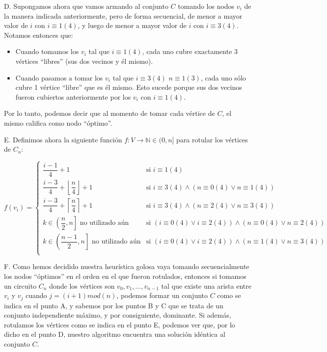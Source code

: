 D. Supongamos ahora que vamos armando al conjunto $C$ tomando los nodos $v_i$ de la manera indicada anteriormente, pero de forma secuencial, de menor a mayor valor de $i$ con $i \equiv 1 (4)$, y luego de menor a mayor valor de $i$ con $i \equiv 3 (4)$. Notamos entonces que:

\begin{itemize}
	\item Cuando tomamos los $v_i$ tal que $i \equiv 1 (4)$, cada uno cubre exactamente 3 vértices ``libres'' (sus dos vecinos y él mismo).
	\item Cuando pasamos a tomar los $v_i$ tal que $i \equiv 3 (4)$ $n \equiv 1 (3)$, cada uno sólo cubre 1 vértice ``libre'' que es él mismo.  Esto sucede porque sus dos vecinos fueron cubiertos anteriormente por los $v_i$ con $i \equiv 1 (4)$.
\end{itemize}

Por lo tanto, podemos decir que al momento de tomar cada vértice de $C$, el mismo califica como nodo ``óptimo''.

E. Definimos ahora la siguiente función $f:V \rightarrow \mathbb{N} \in (0,n]$ para rotular los vértices de $C_n$:

\begin{equation*}
f(v_i) = \begin{cases}
\dfrac{i-1}{4}+1 & \text{si } i \equiv 1 (4)\\
\dfrac{i-3}{4}+\left\lfloor \dfrac{n}{4} \right\rfloor + 1 & \text{si } i \equiv 3 (4) \wedge (n \equiv 0 (4) \vee n \equiv 1 (4))\\
\dfrac{i-3}{4}+\left\lceil \dfrac{n}{4} \right\rceil + 1 & \text{si } i \equiv 3 (4) \wedge (n \equiv 2 (4) \vee n \equiv 3 (4))\\
k \in \left(\dfrac{n}{2},n\right] \text{ no utilizado aún} & \text{si } (i \equiv 0 (4) \vee i \equiv 2 (4)) \wedge (n \equiv 0 (4) \vee n \equiv 2 (4))\\
k \in \left(\dfrac{n-1}{2},n\right] \text{ no utilizado aún} & \text{si } (i \equiv 0 (4) \vee i \equiv 2 (4)) \wedge (n \equiv 1 (4) \vee n \equiv 3 (4))\\
\end{cases}
\end{equation*}

F. Como hemos decidido nuestra heurística golosa vaya tomando secuencialmente los nodos ``óptimos'' en el orden en el que fueron rotulados, entonces si tomamos un circuito $C_n$ donde los vértices son $v_0,v_1,...,v_{n-1}$ tal que existe una arista entre $v_i$ y $v_j$ cuando $j = (i+1) mod (n)$, podemos formar un conjunto $C$ como se indica en el punto A, y sabemos por los puntos B y C que se trata de un conjunto independiente máximo, y por consiguiente, dominante.  Si además, rotulamos los vértices como se indica en el punto E, podemos ver que, por lo dicho en el punto D, nuestro algoritmo encuentra una solución idéntica al conjunto $C$. 

